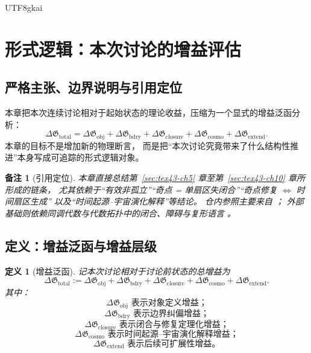 \documentclass[12pt]{article}
\newtheorem{definition}{定义}[section]
\newtheorem{remark}{备注}[section]
\begin{document}
\begin{CJK*}{UTF8}{gkai}
\clearpage

\section{形式逻辑：本次讨论的增益评估}
\label{sec:tex43-ch11}

\subsection{严格主张、边界说明与引用定位}
\label{subsec:tex43-ch11-convention}

本章把本次连续讨论相对于起始状态的理论收益，压缩为一个显式的增益泛函分析：
\[
  \boxed{
    \Delta \mathfrak G_{\mathrm{total}}
    =
    \Delta \mathfrak G_{\mathrm{obj}}
    +
    \Delta \mathfrak G_{\mathrm{bdry}}
    +
    \Delta \mathfrak G_{\mathrm{closure}}
    +
    \Delta \mathfrak G_{\mathrm{cosmo}}
    +
    \Delta \mathfrak G_{\mathrm{extend}}.
  }
\]
本章的目标不是增加新的物理断言，
而是把“本次讨论究竟带来了什么结构性推进”本身写成可追踪的形式逻辑对象。

\begin{remark}[引用定位]
本章直接总结第~\ref{sec:tex43-ch5} 章至第~\ref{sec:tex43-ch10} 章所形成的链条，
尤其依赖于“有效非孤立”“奇点 = 单扇区失闭合”“奇点修复 $\iff$ 时间扇区生成”
以及“时间起源--宇宙演化解释”等结论。
仓内参照主要来自
\cite{RepoTex23OpenSystemGame,RepoTex29RepairableObstruction,RepoTex38JacobiBianchiRepair,RepoTex39StatRepair,
  GaoZheng2025GFramework}；
外部基础则依赖同调代数与代数拓扑中的闭合、障碍与复形语言
\cite{Weibel1994HomologicalAlgebra,Hatcher2002AT}。
\end{remark}

\subsection{定义：增益泛函与增益层级}
\label{subsec:tex43-ch11-definitions}

\begin{definition}[增益泛函]
\label{def:tex43-gain-functional}
记本次讨论相对于讨论前状态的总增益为
\[
  \Delta \mathfrak G_{\mathrm{total}}
  :=
  \Delta \mathfrak G_{\mathrm{obj}}
  +
  \Delta \mathfrak G_{\mathrm{bdry}}
  +
  \Delta \mathfrak G_{\mathrm{closure}}
  +
  \Delta \mathfrak G_{\mathrm{cosmo}}
  +
  \Delta \mathfrak G_{\mathrm{extend}}.
\]
其中：
\[
  \Delta \mathfrak G_{\mathrm{obj}}
  \text{ 表示对象定义增益；}
\]
\[
  \Delta \mathfrak G_{\mathrm{bdry}}
  \text{ 表示边界纠偏增益；}
\]
\[
  \Delta \mathfrak G_{\mathrm{closure}}
  \text{ 表示闭合与修复定理化增益；}
\]
\[
  \Delta \mathfrak G_{\mathrm{cosmo}}
  \text{ 表示时间起源--宇宙演化解释增益；}
\]
\[
  \Delta \mathfrak G_{\mathrm{extend}}
  \text{ 表示后续可扩展性增益。}
\]
\end{definition}


\end{CJK*}
\end{document}

